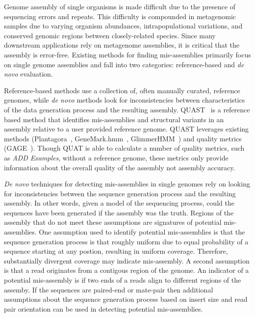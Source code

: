 \documentclass{bioinfo}
\begin{document}
Genome assembly of single organisms is made difficult due to the presence of sequencing errors and repeats.
This difficulty is compounded in metagenomic samples due to varying organism abundances, intrapopulational variations, and conserved genomic regions between closely-related species.
Since many downstream applications rely on metagenome assemblies, it is critical that the assembly is error-free.
Existing methods for finding mis-assemblies primarily focus on single genome assemblies and fall into two categories: reference-based and \emph{de novo} evaluation.

Reference-based methods use a collection of, often manually curated, reference genomes, while \emph{de novo} methods look for inconsistencies between characteristics of the data generation process and the resulting assembly.
QUAST~\citep{gurevich2013quast} is a reference based method that identifies mis-assemblies and structural variants in an assembly relative to a user provided reference genome.
QUAST leverages existing methods (Plantagora~\citep{barthelson2011plantagora},
GeneMark.hmm~\citep{lukashin1998genemark}, GlimmerHMM~\citep{majoros2004tigrscan}) and quality metrics (GAGE~\citep{salzberg2011gage}).
Though QUAT is able to calculate a number of quality metrics, such as \emph{ADD Examples}, without a reference genome, these metrics only provide information about the overall quality of the assembly not assembly accuracy.

\emph{De novo} techniques for detecting mis-assemblies in single genomes rely on looking for inconsistencies between the sequence generation process and the resulting assembly.
In other words, given a model of the sequencing process, could the sequences have been generated if the assembly was the truth.
Regions of the assembly that do not meet these assumptions are signatures of potential mis-assemblies.
One assumption used to identify potential mis-assemblies is that the sequence generation process is that roughly uniform due to equal probability of a sequence starting at any postion, resulting in uniform coverage.
Therefore, substantially divergent coverage may indicate mis-assembly.
A second assumption is that a read originates from a contigous region of the genome.  An indicator of a potential mis-assembly is if two ends of a reads align to different regions of the assemby.
If the sequences are paired-end or mate-pair then additional assumptions about the sequence generation process based on insert size and read pair orientation can be used in detecting potential mis-assemblies.
\end{document}
